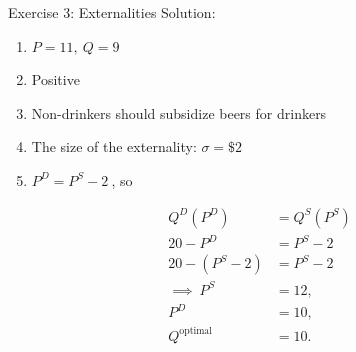 \documentclass[9pt, handout]{beamer}
\begin{document}
\begin{frame}{Exercise 3: Externalities}
    Solution:
    \begin{enumerate}
        \item $P=11, \: Q = 9$
        \item Positive
        \item Non-drinkers should subsidize beers for drinkers
        \item The size of the externality: $\sigma = \$2$
        \item $P^D = P^S - 2 \:$, so 
    \end{enumerate}
    \begin{align*}
        Q^D(P^D) &= Q^S(P^S)\\
        20 - P^D &= P^S - 2\\
        20 - (P^S - 2) &= P^S - 2\\
        \implies \: P^S &= 12,\\
        P^D &= 10,\\
        Q^{\textrm{optimal}} &= 10.
    \end{align*}
\end{frame}
\end{document}
